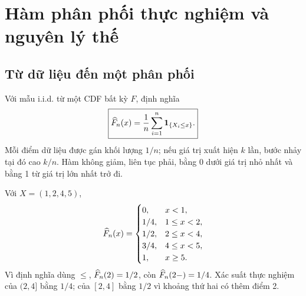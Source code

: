 \chapter{Hàm phân phối thực nghiệm và nguyên lý thế}\label{ch:edf}
\section{Từ dữ liệu đến một phân phối}
Với mẫu i.i.d. từ một CDF bất kỳ $F$, định nghĩa
\[
\boxed{\widehat F_n(x)=\frac1n\sum_{i=1}^n\mathbf 1_{\{X_i\leq x\}}.}
\]
Mỗi điểm dữ liệu được gán khối lượng $1/n$; nếu giá trị xuất hiện $k$ lần,
bước nhảy tại đó cao $k/n$. Hàm không giảm, liên tục phải, bằng 0 dưới
giá trị nhỏ nhất và bằng 1 từ giá trị lớn nhất trở đi.

\begin{example}
Với $X=(1,2,4,5)$,
\[
\widehat F_n(x)=\begin{cases}
0,&x<1,\\1/4,&1\leq x<2,\\1/2,&2\leq x<4,\\
3/4,&4\leq x<5,\\1,&x\geq5.
\end{cases}
\]
Vì định nghĩa dùng $\leq$, $\widehat F_n(2)=1/2$, còn
$\widehat F_n(2-)=1/4$. Xác suất thực nghiệm của $(2,4]$ bằng $1/4$;
của $[2,4]$ bằng $1/2$ vì khoảng thứ hai có thêm điểm 2.
\end{example}

